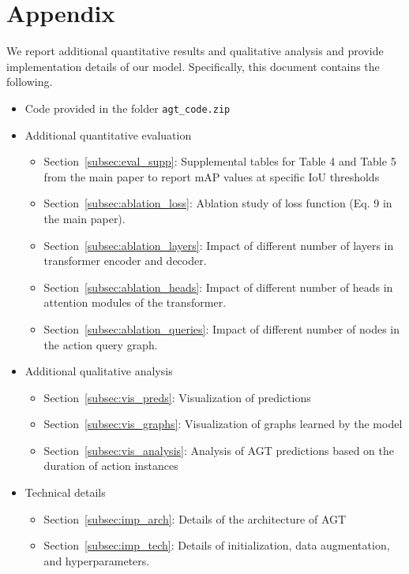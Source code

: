 \documentclass[10pt,twocolumn,letterpaper]{article}
\begin{document}
\section{Appendix}
We report additional quantitative results and qualitative analysis and provide implementation details of our model. Specifically, this document contains the following.
\begin{itemize}
\item Code provided in the folder \texttt{agt\_code.zip}
    
    \item Additional quantitative evaluation
     \vspace{-1mm}
     \begin{itemize}
     \setlength\itemsep{0mm}
     \item Section~\ref{subsec:eval_supp}: Supplemental tables for Table 4 and Table 5 from the main paper to report mAP values at specific IoU thresholds
     \item Section~\ref{subsec:ablation_loss}: Ablation study of loss function (Eq. 9 in the main paper).
     \item  Section~\ref{subsec:ablation_layers}: Impact of different number of layers in transformer encoder and decoder.
     \item Section~\ref{subsec:ablation_heads}: Impact of different number of heads in attention modules of the transformer.
     \item Section~\ref{subsec:ablation_queries}: Impact of different number of nodes in the action query graph.
     \end{itemize}
     \item Additional qualitative analysis
    \vspace{-1mm}
     \begin{itemize}
        \setlength\itemsep{0mm}
         \item Section~\ref{subsec:vis_preds}: Visualization of predictions
         \item Section~\ref{subsec:vis_graphs}: Visualization of graphs learned by the model
         \item
        Section~\ref{subsec:vis_analysis}: Analysis of AGT predictions based on the duration of action instances 

     \end{itemize}
     \item Technical details
     \vspace{-1mm}
     \begin{itemize}
        \setlength\itemsep{0mm}
         \item Section~\ref{subsec:imp_arch}: Details of the architecture of AGT
         \item Section~\ref{subsec:imp_tech}: Details of initialization, data augmentation, and hyperparameters.
     \end{itemize}

\end{itemize}
\end{document}
